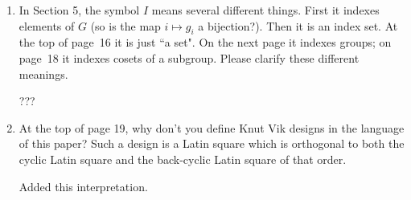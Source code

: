 \documentclass[12pt,a4paper]{article}
\newenvironment{QandA}{\begin{enumerate}[label=\bfseries\alph*.]\bfseries}
                      {\end{enumerate}}
\newenvironment{answered}{\par\normalfont}{}
\begin{document}
\begin{QandA}
\item In Section 5, the symbol $I$ means several different things. First it indexes elements of $G$ (so is the map $i \mapsto g_i$ a bijection?). Then it is an index set. At the top of page~16 it is just ``a set". On the next page it indexes groups; on page~18 it indexes cosets of a subgroup. Please clarify these different meanings.


\begin{answered}
???
\end{answered}

\item At the top of page 19, why don't you define Knut Vik designs in the language of this paper? Such a design is a Latin square which is orthogonal to both the cyclic Latin square and the back-cyclic Latin square of that order.



\begin{answered}
Added this interpretation.
\end{answered}


\end{QandA}
\end{document}
